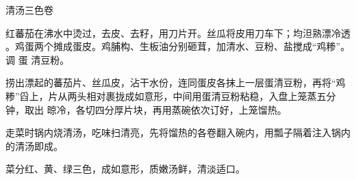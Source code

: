 \begin{recipe}[三色如意卷]{清汤三色卷}

\ingredients


\preparation

\step 红蕃茄在沸水中烫过，去皮、去籽，用刀片开。丝瓜将皮用刀车下；均泹熟漂冷透
。鸡蛋两个摊成蛋皮。鸡脯构、生板油分别砸茸，加清水、豆粉、盐搅成“鸡糁”。调 蛋
清豆粉。

\step 捞出漂起的蕃茄片、丝瓜皮，沾干水份，连同蛋皮各抹上一层蛋清豆粉，再将“鸡
糁”舀上，片从两头相对裹拢成如意形，中间用蛋清豆粉粘稳，入盘上笼蒸五分钟，取出
晾冷，各切四分厚片块，再用蒸碗依次订好，上笼馏热。

\step 走菜时锅内烧清汤，吃味扫清亮，先将馏热的各卷翻入碗内，用瓢子隔着注入锅内
的清汤即成。

\features

菜分红、黄、绿三色，成如意形，质嫩汤鲜，清淡适口。

\end{recipe}

